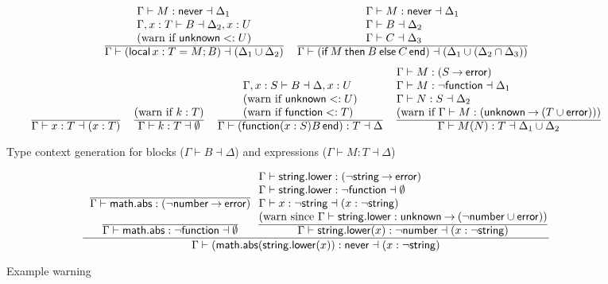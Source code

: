 \documentclass[sigplan]{acmart}
\makeatletter
\newcommand{\infer}[2]{\frac{\displaystyle\begin{array}{@{}l@{}}#1\end{array}}{\displaystyle#2}}
\newcommand{\LOCAL}{\mathop{\mathsf{local}}}
\newcommand{\FUNCTION}{\mathop{\mathsf{function}}}
\newcommand{\IF}{\mathop{\mathsf{if}}}
\newcommand{\THEN}{\mathbin{\mathsf{then}}}
\newcommand{\ELSE}{\mathbin{\mathsf{else}}}
\newcommand{\END}{\mathop{\mathsf{end}}}
\newcommand{\NEVER}{\mathsf{never}}
\newcommand{\ERROR}{\mathsf{error}}
\newcommand{\UNKNOWN}{\mathsf{unknown}}
\newcommand{\STRING}{\mathsf{string}}
\newcommand{\NUMBER}{\mathsf{number}}
\newcommand{\MATH}{\mathsf{math}}
\newcommand{\ABS}{\mathsf{abs}}
\newcommand{\LOWER}{\mathsf{lower}}
\newcommand{\fun}{\mathbin{\rightarrow}}
\makeatother
\begin{document}
\begin{figure}
  \[\begin{array}{c}
    \infer{
      \Gamma \vdash M : \NEVER \dashv \Delta_1 \\
      \Gamma, x : T \vdash B \dashv \Delta_2, x : U \\
      \mbox{(warn if $\UNKNOWN <: U$)}
    }{
      \Gamma \vdash (\LOCAL x : T = M; B) \dashv (\Delta_1 \cup \Delta_2)
    }
    \quad
    \infer{
      \Gamma \vdash M : \NEVER \dashv \Delta_1 \\
      \Gamma \vdash B \dashv \Delta_2 \\
      \Gamma \vdash C \dashv \Delta_3 
    }{
      \Gamma \vdash (\IF M \THEN B \ELSE C \END) \dashv (\Delta_1 \cup (\Delta_2 \cap \Delta_3))
    }
  \\[\bigskipamount]
    \infer{}{
      \Gamma \vdash x : T \dashv (x : T)
    }
    \quad
    \infer{
      \mbox{(warn if $k:T$)}
    }{
      \Gamma \vdash k : T \dashv \emptyset
    }
    \quad
    \infer{
      \Gamma, x:S \vdash B \dashv \Delta, x:U \\
      \mbox{(warn if $\UNKNOWN <: U$)}\\
      \mbox{(warn if ${\FUNCTION} <: T$)}
    }{
      \Gamma \vdash (\FUNCTION (x : S) B \END) : T \dashv \Delta
    }
    \quad
    \infer{
      \Gamma \vdash M : (S \fun \ERROR) \\
      \Gamma \vdash M : \neg{\FUNCTION} \dashv \Delta_1 \\
      \Gamma \vdash N : S \dashv \Delta_2  \\
      \mbox{(warn if $\Gamma \vdash M : (\UNKNOWN \fun (T \cup \ERROR))$)}
    }{
      \Gamma \vdash M(N) : T \dashv \Delta_1 \cup \Delta_2
    }
  \end{array}\]
  \caption{Type context generation for blocks ($\Gamma \vdash B \dashv \Delta$) and expressions ($\Gamma \vdash M:T \dashv \Delta$)}
  \label{fig:ctxtgen}
\end{figure}

\begin{figure}
  \[
    \infer{
      \begin{array}[b]{c}
      \infer{}{\Gamma \vdash \MATH.\ABS : (\neg\NUMBER \fun \ERROR)} \\[\bigskipamount]
      \infer{}{\Gamma \vdash \MATH.\ABS : \neg{\FUNCTION} \dashv \emptyset}
      \end{array}
      \infer{
        \Gamma \vdash \STRING.\LOWER : (\neg\STRING \fun \ERROR) \\
        \Gamma \vdash \STRING.\LOWER : \neg{\FUNCTION} \dashv \emptyset \\
        \Gamma \vdash x : \neg{\STRING} \dashv (x : \neg\STRING) \\
        \mbox{(warn since $\Gamma \vdash \STRING.\LOWER : \UNKNOWN \fun (\neg\NUMBER \cup \ERROR)$)}
      }{\Gamma \vdash \STRING.\LOWER(x) : \neg{\NUMBER} \dashv (x : \neg\STRING)}
    }{\Gamma \vdash (\MATH.\ABS(\STRING.\LOWER(x)) : \NEVER \dashv (x : \neg\STRING)}
  \]
  \caption{Example warning}
  \label{fig:example}
\end{figure}
\end{document}
